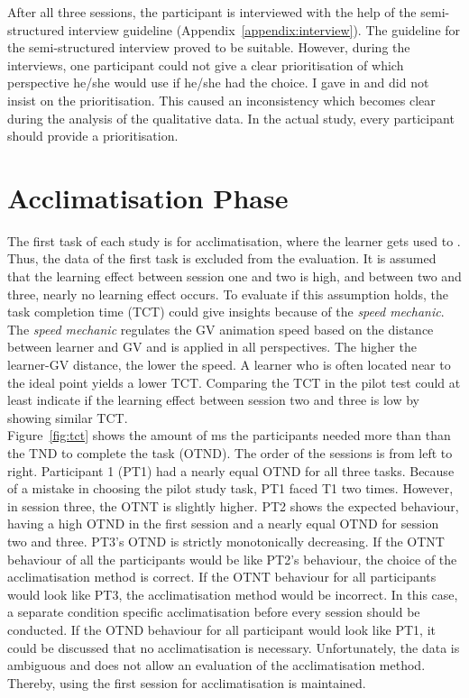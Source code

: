 After all three sessions, the participant is interviewed with the help of the semi-structured interview guideline (Appendix~\ref{appendix:interview}). The guideline for the semi-structured interview proved to be suitable. However, during the interviews, one participant could not give a clear prioritisation of which perspective he/she would use if he/she had the choice. I gave in and did not insist on the prioritisation. This caused an inconsistency which becomes clear during the analysis of the qualitative data. In the actual study, every participant should provide a prioritisation.

\section{Acclimatisation Phase}
\label{sec:evalAccl}
The first task of each study is for acclimatisation, where the learner gets used to \exgo. Thus, the data of the first task is excluded from the evaluation. It is assumed that the learning effect between session one and two is high, and between two and three, nearly no learning effect occurs. To evaluate if this assumption holds, the task completion time (TCT) could give insights because of the \textit{speed mechanic}. The \textit{speed mechanic} regulates the GV animation speed based on the distance between learner and GV and is applied in all perspectives. The higher the learner-GV distance, the lower the speed. A learner who is often located near to the ideal point yields a lower TCT. Comparing the TCT in the pilot test could at least indicate if the learning effect between session two and three is low by showing similar TCT.\\
Figure~\ref{fig:tct} shows the amount of ms the participants needed more than than the TND to complete the task (OTND). The order of the sessions is from left to right. Participant 1 (PT1) had a nearly equal OTND for all three tasks. Because of a mistake in choosing the pilot study task, PT1 faced T1 two times. However, in session three, the OTNT is slightly higher. PT2 shows the expected behaviour, having a high OTND in the first session and a nearly equal OTND for session two and three. PT3's OTND is strictly monotonically decreasing. If the OTNT behaviour of all the participants would be like PT2's behaviour, the choice of the acclimatisation method is correct. If the OTNT behaviour for all participants would look like PT3, the acclimatisation method would be incorrect. In this case, a separate condition specific acclimatisation before every session should be conducted. If the OTND behaviour for all participant would look like PT1, it could be discussed that no acclimatisation is necessary. Unfortunately, the data is ambiguous and does not allow an evaluation of the acclimatisation method. Thereby, using the first session for acclimatisation is maintained.

